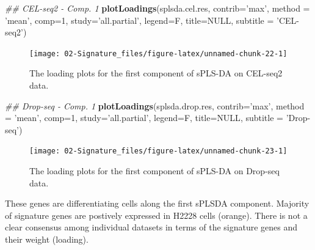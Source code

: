 \documentclass[]{book}
\newenvironment{Shaded}{\begin{snugshade}}{\end{snugshade}}
\newcommand{\CommentTok}[1]{\textcolor[rgb]{0.56,0.35,0.01}{\textit{#1}}}
\newcommand{\DataTypeTok}[1]{\textcolor[rgb]{0.13,0.29,0.53}{#1}}
\newcommand{\DecValTok}[1]{\textcolor[rgb]{0.00,0.00,0.81}{#1}}
\newcommand{\KeywordTok}[1]{\textcolor[rgb]{0.13,0.29,0.53}{\textbf{#1}}}
\newcommand{\NormalTok}[1]{#1}
\newcommand{\OtherTok}[1]{\textcolor[rgb]{0.56,0.35,0.01}{#1}}
\newcommand{\StringTok}[1]{\textcolor[rgb]{0.31,0.60,0.02}{#1}}
\theoremstyle{definition}
\theoremstyle{definition}
\theoremstyle{definition}
\theoremstyle{remark}
\begin{document}
\begin{Shaded}
\begin{Highlighting}[]
\CommentTok{## CEL-seq2 - Comp. 1}
\KeywordTok{plotLoadings}\NormalTok{(splsda.cel.res, }\DataTypeTok{contrib=}\StringTok{'max'}\NormalTok{, }\DataTypeTok{method =} \StringTok{'mean'}\NormalTok{, }\DataTypeTok{comp=}\DecValTok{1}\NormalTok{, }
             \DataTypeTok{study=}\StringTok{'all.partial'}\NormalTok{, }\DataTypeTok{legend=}\NormalTok{F, }\DataTypeTok{title=}\OtherTok{NULL}\NormalTok{,}
             \DataTypeTok{subtitle =} \StringTok{'CEL-seq2'}\NormalTok{)}
\end{Highlighting}
\end{Shaded}

\begin{figure}[ht]

{\centering \texttt{[image: 02-Signature\_files/figure-latex/unnamed-chunk-22-1]} 

}

\caption{The loading plots for the first component of sPLS-DA on CEL-seq2 data.}\label{fig:unnamed-chunk-22}
\end{figure}

\begin{Shaded}
\begin{Highlighting}[]
\CommentTok{## Drop-seq - Comp. 1}
\KeywordTok{plotLoadings}\NormalTok{(splsda.drop.res, }\DataTypeTok{contrib=}\StringTok{'max'}\NormalTok{, }\DataTypeTok{method =} \StringTok{'mean'}\NormalTok{, }\DataTypeTok{comp=}\DecValTok{1}\NormalTok{, }
             \DataTypeTok{study=}\StringTok{'all.partial'}\NormalTok{, }\DataTypeTok{legend=}\NormalTok{F, }\DataTypeTok{title=}\OtherTok{NULL}\NormalTok{,}
             \DataTypeTok{subtitle =} \StringTok{'Drop-seq'}\NormalTok{)}
\end{Highlighting}
\end{Shaded}

\begin{figure}[ht]

{\centering \texttt{[image: 02-Signature\_files/figure-latex/unnamed-chunk-23-1]} 

}

\caption{The loading plots for the first component of sPLS-DA on Drop-seq data.}\label{fig:unnamed-chunk-23}
\end{figure}

These genes are differentiating cells along the first sPLSDA component.
Majority of signature genes are postively expressed in H2228 cells
(orange). There is not a clear consensus among individual datasets in
terms of the signature genes and their weight (loading).
\end{document}
